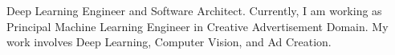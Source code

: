 \par{
	Deep  Learning Engineer and Software Architect. Currently, I am working as Principal Machine Learning Engineer in Creative Advertisement Domain. My work involves Deep Learning, Computer Vision, and Ad Creation. 
}
